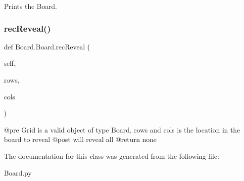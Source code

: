 \begin{DoxyVerb}Prints the Board.
\end{DoxyVerb}
 \mbox{\label{class_board_1_1_board_a4a027666af1fa52582af6543985a73c6}} 
\subsubsection{\texorpdfstring{rec\+Reveal()}{recReveal()}}
{\footnotesize\ttfamily def Board.\+Board.\+rec\+Reveal (\begin{DoxyParamCaption}\item[{}]{self,  }\item[{}]{rows,  }\item[{}]{cols }\end{DoxyParamCaption})}

\begin{DoxyVerb}@pre    Grid is a valid object of type Board, rows and cols is the location in the board to reveal
    @post   will reveal all
    @return none
\end{DoxyVerb}
 

The documentation for this class was generated from the following file\+:\begin{DoxyCompactItemize}
\item 
Board.\+py\end{DoxyCompactItemize}

